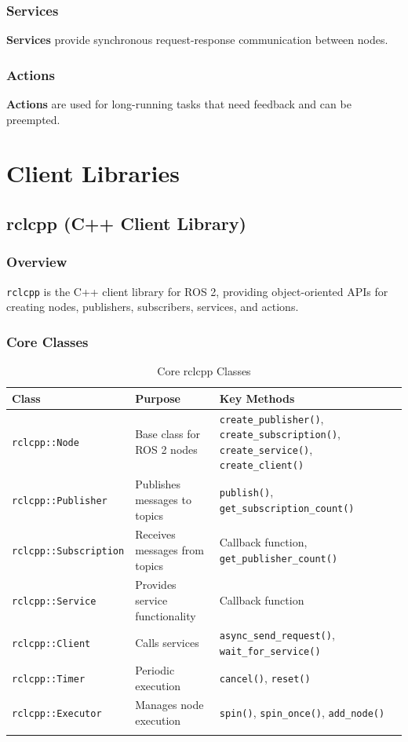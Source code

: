 \documentclass[a4paper,12pt]{book}
\newcommand{\code}[1]{\texttt{#1}}
\newcommand{\important}[1]{\textbf{\color{ros2orange}#1}}
\begin{document}
\subsection{Services}
\important{Services} provide synchronous request-response communication between nodes.

\subsection{Actions}
\important{Actions} are used for long-running tasks that need feedback and can be preempted.

\chapter{Client Libraries}

\section{rclcpp (C++ Client Library)}

\subsection{Overview}
\code{rclcpp} is the C++ client library for ROS 2, providing object-oriented APIs for creating nodes, publishers, subscribers, services, and actions.

\subsection{Core Classes}

\begin{longtable}{|p{3cm}|p{4cm}|p{7cm}|}
\hline
\textbf{Class} & \textbf{Purpose} & \textbf{Key Methods} \\
\hline
\endhead
\code{rclcpp::Node} & Base class for ROS 2 nodes & \code{create\_publisher()}, \code{create\_subscription()}, \code{create\_service()}, \code{create\_client()} \\
\hline
\code{rclcpp::Publisher} & Publishes messages to topics & \code{publish()}, \code{get\_subscription\_count()} \\
\hline
\code{rclcpp::Subscription} & Receives messages from topics & Callback function, \code{get\_publisher\_count()} \\
\hline
\code{rclcpp::Service} & Provides service functionality & Callback function \\
\hline
\code{rclcpp::Client} & Calls services & \code{async\_send\_request()}, \code{wait\_for\_service()} \\
\hline
\code{rclcpp::Timer} & Periodic execution & \code{cancel()}, \code{reset()} \\
\hline
\code{rclcpp::Executor} & Manages node execution & \code{spin()}, \code{spin\_once()}, \code{add\_node()} \\
\hline
\caption{Core rclcpp Classes}
\label{tab:rclcpp_classes}
\end{longtable}
\end{document}
